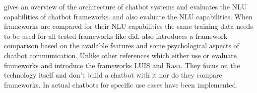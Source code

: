 \citet{braunEvaluatingNLU} gives an overview of the architecture of chatbot systems and evaluates the NLU capabilities of chatbot frameworks.
\citet{gregori2017evaluation} and \citet{dutta2017developing} also evaluate the NLU capabilities.
When frameworks are compared for their NLU capabilities the same training data needs to be used 
for all tested frameworks like \citet{braunEvaluatingNLU,gregori2017evaluation} did.
\citet{dutta2017developing} also introduces a framework comparison based on the available features
and some psychological aspects of chatbot communication.
Unlike other references which either use or evaluate frameworks \citet{luis2015williams} and \citet{rasabocklisch2017} 
introduce the frameworks LUIS\cite{luis2015williams} and Rasa\cite{rasabocklisch2017}. 
They focus on the technology itself and don't build a chatbot with it nor do they compare frameworks.
In \citet{dutta2017developing, pharmacybot, PRZEGALINSKA2019785} actual chatbots for specific use cases have been implemented.


